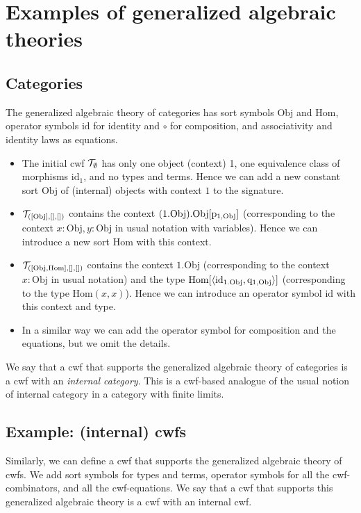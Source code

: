 \documentclass{lmcs}
\def\Obj{\mathrm{Obj}}
\def\Hom{\mathrm{Hom}}
\def\id{\mathrm{id}}
\begin{document}
\section{Examples of generalized algebraic theories}

\subsection{Categories} 
The generalized algebraic theory of categories has sort symbols $\Obj$ 
and $\Hom$, operator symbols $\id$ for identity and $\circ$ for composition, and associativity and identity laws as equations. 
\begin{itemize}
\item The initial cwf ${\mathcal T}_\emptyset$ has only one object (context) 1, one equivalence class of morphisms $\id_1$, and no types and terms. Hence we can add a new constant sort $\Obj$ of (internal) objects with context $1$ to the signature. 
\item $\T_{([\Obj],[],[])}$ contains the context $(1.\Obj).\Obj[\p_{1,\Obj}]$ (corresponding to the context $x : \Obj, y : \Obj$ in usual notation with variables). Hence we can introduce a new sort $\Hom$ with this context.
\item $\T_{([\Obj, \Hom],[],[])}$ contains the context $1.\Obj$ (corresponding to the context $x : \Obj$ in usual notation) and the type $\Hom[\tuple{\id_{1.\Obj},\q_{1,\Obj}}]$ (corresponding to the type $\Hom(x,x)$). Hence we can introduce an operator symbol $\id$ with this context and type.
\item In a similar way we can add the operator symbol for composition and the equations, but we omit the details.
\end{itemize}

We say that a cwf that supports the generalized algebraic theory of categories is a cwf with an {\em internal category}. This is a cwf-based analogue of the usual notion of internal category in a category with finite limits.

\subsection{Example: (internal) cwfs} Similarly, we can define a cwf that supports the generalized algebraic theory of cwfs. We add sort symbols for types and terms, operator symbols for all the cwf-combinators, and all the cwf-equations. We say that a cwf that supports this generalized algebraic theory is a cwf with an internal cwf.
\end{document}
